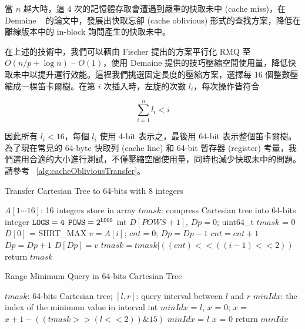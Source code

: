 \documentclass{gapd}
\begin{document}
當 $n$ 越大時，這 4 次的記憶體存取會遭遇到嚴重的快取未中 (cache miss)，在 Demaine ~\cite{demaine} 的論文中，發展出快取忘卻 (cache oblivious) 形式的查找方案，降低在離線版本中的 in-block 詢問產生的快取未中。

在上述的技術中，我們可以藉由 Fischer 提出的方案平行化 RMQ 至 $O(n / p + \log n)$ -- $O(1)$，使用 Demaine 提供的技巧壓縮空間使用量，降低快取未中以提升運行效能。這裡我們挑選固定長度的壓縮方案，選擇每 16 個整數壓縮成一棵笛卡爾樹。在第 $i$ 次插入時，左旋的次數 $l_i$，每次操作皆符合 

$$\sum_{i=1}^{n} l_i < i$$

因此所有 $l_i < 16$，每個 $l_i$ 使用 4-bit 表示之，最後用 64-bit 表示整個笛卡爾樹。為了現在常見的 64-byte 快取列 (cache line) 和 64-bit 暫存器 (register) 考量，我們選用合適的大小進行測試，不僅壓縮空間使用量，同時也減少快取未中的問題。請參考 ~\ref{alg:cacheObliviousTransfer}。

\begin{algorithm*}
  \caption{Transfer Cartesian Tree to 64-bits with 8 integers}
  \label{alg:cacheObliviousTransfer}
  \begin{algorithmic}[1]
    \Require
      $A[1 \cdots 16]$: 16 integers store in array
    \Ensure 
      $\textit{tmask}$: compress Cartesian tree into 64-bits integer
      \State $\tt{LOGS} = 4$
      \State $\tt{POWS} = 2^{\tt{LOGS}}$
      \State int $D[POWS+1]$, $Dp = 0$;
      \State uint64\_t $tmask$ = $0$
      \State $D[0]$ = SHRT\_MAX
        \State $v = A[i]$;
        \State $cnt = 0$;
          \State $Dp = Dp-1$
          \State $cnt = cnt + 1$
        \EndWhile
        \State $Dp = Dp+1$
        \State $D[Dp] = v$
        \State $tmask = tmask | ((cnt)<<((i-1)<<2))$
      \EndFor
      \State return $tmask$
  \end{algorithmic}
\end{algorithm*}

\begin{algorithm*}
  \caption{Range Minimum Query in 64-bits Cartesian Tree}
  \label{alg:cacheObliviousQuery}
  \begin{algorithmic}[1]
    \Require
      $\textit{tmask}$: 64-bits Cartesian tree;
      $[l, r]$: query interval between $l$ and $r$
    \Ensure 
      $\textit{minIdx}$: the index of the minimum value in interval
    \State int $\textit{minIdx}$ = $l$, $x$ = $0$;
      \State $x$ = $x+1 - ((tmask>>(l<<2))\&15)$
        \State $\textit{minIdx}$ = $l$
        \State $x$ = $0$
      \EndIf
    \EndFor
    \State return $\textit{minIdx}$
  \end{algorithmic}
\end{algorithm*}
\end{document}
